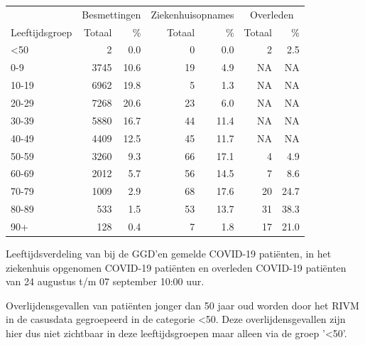 \documentclass[
  english,
  man,floatsintext]{apa6}
\begin{document}
\begin{table}
\centering\begingroup\fontsize{11}{13}\selectfont

\begin{threeparttable}
\begin{tabular}{lrrrrrr}
\toprule
\multicolumn{1}{c}{ } & \multicolumn{2}{c}{Besmettingen} & \multicolumn{2}{c}{Ziekenhuisopnames} & \multicolumn{2}{c}{Overleden} \\
\cmidrule(l{3pt}r{3pt}){2-3} \cmidrule(l{3pt}r{3pt}){4-5} \cmidrule(l{3pt}r{3pt}){6-7}
Leeftijdsgroep & Totaal & \% & Totaal & \% & Totaal & \%\\
\midrule
<50 & 2 & 0.0 & 0 & 0.0 & 2 & 2.5\\
0-9 & 3745 & 10.6 & 19 & 4.9 & NA & NA\\
10-19 & 6962 & 19.8 & 5 & 1.3 & NA & NA\\
20-29 & 7268 & 20.6 & 23 & 6.0 & NA & NA\\
30-39 & 5880 & 16.7 & 44 & 11.4 & NA & NA\\
40-49 & 4409 & 12.5 & 45 & 11.7 & NA & NA\\
50-59 & 3260 & 9.3 & 66 & 17.1 & 4 & 4.9\\
60-69 & 2012 & 5.7 & 56 & 14.5 & 7 & 8.6\\
70-79 & 1009 & 2.9 & 68 & 17.6 & 20 & 24.7\\
80-89 & 533 & 1.5 & 53 & 13.7 & 31 & 38.3\\
90+ & 128 & 0.4 & 7 & 1.8 & 17 & 21.0\\
\bottomrule
\end{tabular}
\begin{tablenotes}
\item[1] Leeftijdsverdeling van bij de GGD’en gemelde COVID-19 patiënten, in het ziekenhuis opgenomen COVID-19 patiënten en overleden COVID-19 patiënten van 24 augustus t/m 07 september 10:00 uur.
\item[2] Overlijdensgevallen van patiënten jonger dan 50 jaar oud worden door het RIVM in de casusdata gegroepeerd in de categorie <50. Deze overlijdensgevallen zijn hier dus niet zichtbaar in deze leeftijdsgroepen maar alleen via de groep '<50'.
\end{tablenotes}
\end{threeparttable}
\endgroup{}
\end{table}

\newpage
\end{document}
